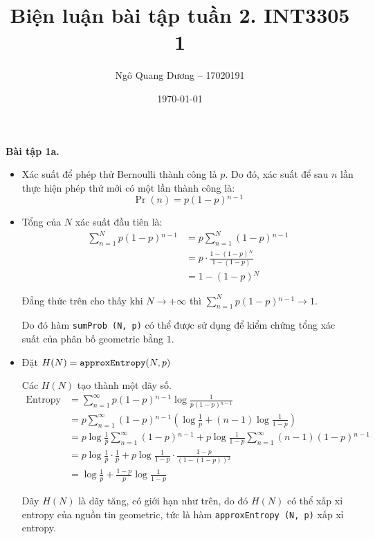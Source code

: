 \documentclass{article}
\title{Biện luận bài tập tuần 2. INT3305 1}
\author{Ngô Quang Dương -- 17020191}
\date{\today}
\begin{document}
\maketitle

\par\textbf{Bài tập 1a.}

\begin{itemize}
    \item Xác suất để phép thử Bernoulli thành công là $p$. Do đó, xác suất để sau $n$ lần thực hiện phép thử mới có một lần thành công là:
        \[ \Pr(n) = p(1-p){}^{n-1} \]
    \item Tổng của $N$ xác suất đầu tiên là:
        \begin{align*}
            \sum^{N}_{n=1}p(1-p){}^{n-1} &= p\sum^{N}_{n=1}(1-p){}^{n-1} \\
                                       &= p\cdot\frac{1 - (1 - p){}^{N}}{1 - (1-p)} \\
                                       &= 1 - (1 - p){}^{N}
        \end{align*}
        \par Đẳng thức trên cho thấy khi $N\to+\infty$ thì $\displaystyle\sum\limits^{N}_{n=1}p(1-p){}^{n-1}\to 1$.
        \par Do đó hàm \texttt{sumProb (N, p)} có thể được sử dụng để kiểm chứng tổng xác suất của phân bố geometric bằng $1$.
    \item Đặt $H(N) = \text{\texttt{approxEntropy}}(N,p)$
        \par Các $H(N)$ tạo thành một dãy số.
        \begin{align*}
            \text{Entropy} &= \sum^{\infty}_{n=1}p(1-p){}^{n-1}\log\frac{1}{p(1-p){}^{n-1}} \\
                 &= p\sum^{\infty}_{n=1}(1-p){}^{n-1}\left(\log\frac{1}{p} + (n-1)\log\frac{1}{1-p}\right) \\
                 &= p\log\frac{1}{p}\sum^{\infty}_{n=1}(1-p){}^{n-1} + p\log\frac{1}{1-p}\sum^{\infty}_{n=1}(n-1)(1-p){}^{n-1} \\
                 &= p\log\frac{1}{p}\cdot\frac{1}{p} + p\log\frac{1}{1-p}\cdot\frac{1-p}{(1-(1-p)){}^{2}} \\
                 &= \log\frac{1}{p} + \frac{1-p}{p}\log\frac{1}{1-p}
        \end{align*}
        \par Dãy $H(N)$ là dãy tăng, có giới hạn như trên, do đó $H(N)$ có thể xấp xỉ entropy của nguồn tin geometric, tức là hàm \texttt{approxEntropy (N, p)} xấp xỉ entropy.
\end{itemize}
\end{document}
